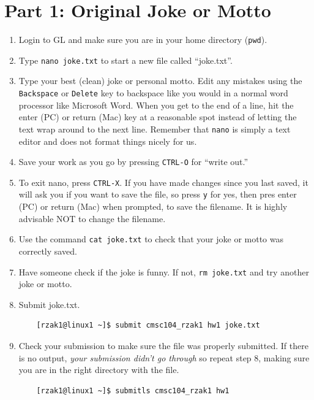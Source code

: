 \documentclass[letter,11pt]{article}
\begin{document}
\section*{Part 1: Original Joke or Motto}
\begin{enumerate}
    \item Login to GL and make sure you are in your home directory (\texttt{pwd}).
    \item Type \texttt{nano joke.txt} to start a new file called ``joke.txt''.
    \item Type your best (clean) joke or personal motto. Edit any mistakes using the \texttt{Backspace} or \texttt{Delete} key to backspace like you would in a normal word processor like Microsoft Word. When you get to the end of a line, hit the enter (PC) or return (Mac) key at a reasonable spot instead of letting the text wrap around to the next line. Remember that \texttt{nano} is simply a text editor and does not format things nicely for us.
    \item Save your work as you go by pressing \texttt{CTRL-O} for ``write out.''
    \item To exit nano, press \texttt{CTRL-X}. If you have made changes since you last saved, it will ask you if you want to save the file, so press \texttt{y} for yes, then pres enter (PC) or return (Mac) when prompted, to save the filename. It is highly advisable NOT to change the filename.
    \item Use the command \texttt{cat joke.txt} to check that your joke or motto was correctly saved.
    \item Have someone check if the joke is funny. If not, \texttt{rm joke.txt} and try another joke or motto.
    \item Submit joke.txt.
    \begin{verbatim}
    [rzak1@linux1 ~]$ submit cmsc104_rzak1 hw1 joke.txt
    \end{verbatim}
    \item Check your submission to make sure the file was properly submitted. If there is no output, \textit{your submission didn’t go through} so repeat step 8, making sure you are in the right directory with the file.
    \begin{verbatim}
    [rzak1@linux1 ~]$ submitls cmsc104_rzak1 hw1
    \end{verbatim}
\end{enumerate}
\end{document}
